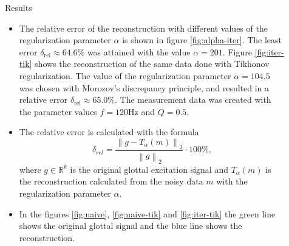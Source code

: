 \documentclass[final]{beamer}
\newcommand{\R}{{\mathbb R}}
\begin{document}
\begin{frame}[t]
\begin{columns}[t]
\begin{column}{.465\textwidth}
\begin{block}{Results}
\begin{itemize}
\item The relative error of the reconstruction with different values of the regularization parameter $\alpha$ is shown in figure \ref{fig:alpha-iter}. The least error $\delta_{\text{rel}} \approx 64.6 \%$ was attained with the value $\alpha = 201$. Figure \ref{fig:iter-tik} shows the reconstruction of the same data done with Tikhonov regularization. The value of the regularization parameter $\alpha = 104.5$ was chosen with Morozov's discrepancy principle, and resulted in a relative error $\delta_{\text{rel}} \approx 65.0 \%$. The measurement data was created with the parameter values $f = 120 \text{Hz}$ and $Q = 0.5$.

\item The relative error is calculated with the formula
\begin{equation*}
\delta_{rel} = \frac{\left\| g - T_{\alpha}(m) \right\|_2}{\left\| g \right\|_2} \cdot 100 \%,
\end{equation*}
where $g \in \R^k$ is the original glottal excitation signal and $T_{\alpha}(m)$ is the reconstruction calculated from the noisy data $m$ with the regularization parameter $\alpha$.

\item In the figures \ref{fig:naive}, \ref{fig:naive-tik} and \ref{fig:iter-tik} the green line shows the original glottal signal and the blue line shows the reconstruction.

\end{itemize}

\end{block}




\end{column} %

\begin{column}{.03\textwidth}\end{column} %


\begin{column}{.465\textwidth} %





\end{column}
\end{columns}
\end{frame}
\end{document}
